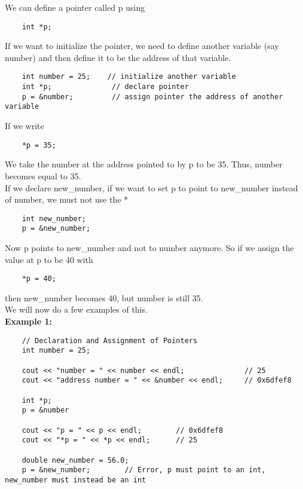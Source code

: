 \documentclass[]{article}
\begin{document}
We can define a pointer called p using

\begin{lstlisting}
	int *p;
\end{lstlisting}\bigbreak

If we want to initialize the pointer, we need to define another variable (say number) and then define it to be the address of that variable.

\begin{lstlisting}
	int number = 25;	// initialize another variable
	int *p;				 // declare pointer
	p = &number;		 // assign pointer the address of another variable
\end{lstlisting}\bigbreak


If we write

\begin{lstlisting}
	*p = 35;
\end{lstlisting}\bigbreak

We take the number at the address pointed to by p to be 35. Thus, number becomes equal to 35.\\

If we declare new\_number, if we want to set p to point to new\_number instead of number, we must not use the *

\begin{lstlisting}
	int new_number;
	p = &new_number;
\end{lstlisting}\bigbreak

Now p points to new\_number and not to number anymore. So if we assign the value at p to be 40 with 

\begin{lstlisting}
	*p = 40;
\end{lstlisting}\bigbreak

then new\_number becomes 40, but number is still 35.\\

We will now do a few examples of this.\\

\textbf{Example 1:}

\begin{lstlisting}
	// Declaration and Assignment of Pointers
	int number = 25;
	
	cout << "number = " << number << endl;				// 25
	cout << "address number = " << &number << endl;		// 0x6dfef8
	
	int *p;
	p = &number
	
	cout << "p = " << p << endl; 		// 0x6dfef8
	cout << "*p = " << *p << endl;		// 25
	
	double new_number = 56.0;
	p = &new_number;		// Error, p must point to an int, new_number must instead be an int
\end{lstlisting}\bigbreak
\end{document}
